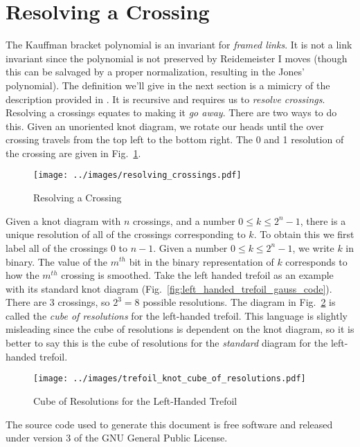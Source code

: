 \documentclass{article}
\theoremstyle{plain}
\begin{document}
    \section{Resolving a Crossing}
        The Kauffman bracket polynomial is an invariant for
        \textit{framed links}. It is not a link invariant since the polynomial
        is not preserved by Reidemeister I moves (though this can be salvaged
        by a proper normalization, resulting in the Jones' polynomial). The
        definition we'll give in the next section is a mimicry of the
        description provided in \cite{barnatan2002khovanov}. It is recursive
        and requires us to \textit{resolve crossings}. Resolving a crossings
        equates to making it \textit{go away}. There are two ways to do this.
        Given an unoriented knot diagram, we rotate our heads until
        the over crossing travels from the top left to the bottom right. The
        0 and 1 resolution of the crossing are given in
        Fig.~\ref{fig:resolving_crossing}.
        \begin{figure}
            \centering
            \texttt{[image: ../images/resolving\_crossings.pdf]}
            \caption{Resolving a Crossing}
            \label{fig:resolving_crossing}
        \end{figure}
        Given a knot diagram with $n$ crossings, and a number
        $0\leq{k}\leq{2}^{n}-1$, there is a unique resolution of all of the
        crossings corresponding to $k$. To obtain this we first label all of
        the crossings $0$ to $n-1$. Given a number $0\leq{k}\leq{2}^{n}-1$,
        we write $k$ in binary. The value of the $m^{th}$ bit in the
        binary representation of $k$ corresponds to how the $m^{th}$ crossing
        is smoothed. Take the left handed trefoil as an example with its
        standard knot diagram (Fig.~\ref{fig:left_handed_trefoil_gauss_code}).
        There are 3 crossings, so $2^{3}=8$ possible resolutions. The diagram
        in Fig.~\ref{fig:trefoil_knot_cube_of_resolutions} is called the
        \textit{cube of resolutions} for the left-handed
        trefoil. This language is slightly misleading since the cube of
        resolutions is dependent on the knot diagram, so it is better to say
        this is the cube of resolutions for the \textit{standard} diagram for
        the left-handed trefoil.
        \begin{figure}
            \centering
            \texttt{[image: ../images/trefoil\_knot\_cube\_of\_resolutions.pdf]}
            \caption{Cube of Resolutions for the Left-Handed Trefoil}
            \label{fig:trefoil_knot_cube_of_resolutions}
        \end{figure}
    \newpage
    
    
    \newpage
    The source code used to generate this document is free software and released
    under version 3 of the GNU General Public License.
\end{document}
